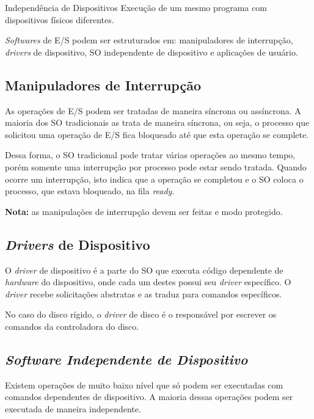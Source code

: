 \begin{definicao}{Independência de Dispositivos}
  Execução de um mesmo programa com dispositivos físicos diferentes.
\end{definicao}

\textit{Softwares} de E/S podem ser estruturados em: manipuladores de interrupção, \textit{drivers} de dispositivo, SO independente de dispositivo e aplicações de usuário.





\subsection{Manipuladores de Interrupção}
As operações de E/S podem ser tratadas de maneira síncrona ou assíncrona. A maioria dos SO tradicionais as trata de maneira síncrona, ou seja, o processo que solicitou uma operação de E/S fica bloqueado até que esta operação se complete.

Dessa forma, o SO tradicional pode tratar várias operações ao mesmo tempo, porém somente uma interrupção por processo pode estar sendo tratada. Quando ocorre um interrupção, isto indica que a operação se completou e o SO coloca o processo, que estava bloqueado, na fila \textit{ready}.

\textbf{Nota:} as manipulações de interrupção devem ser feitas e modo protegido.




\subsection{\textit{Drivers} de Dispositivo}
O \textit{driver} de dispositivo é a parte do SO que executa código dependente de \textit{hardware} do dispositivo, onde cada um destes possui seu \textit{driver} específico. O \textit{driver} recebe solicitações abstratas e as traduz para comandos específicos.

No caso do disco rígido, o \textit{driver} de disco é o responsável por escrever os comandos da controladora do disco.




\subsection{\textit{Software Independente de Dispositivo}}
Existem operações de muito baixo nível que só podem ser executadas com comandos dependentes de dispositivo. A maioria dessas operações podem ser executada de maneira independente.

